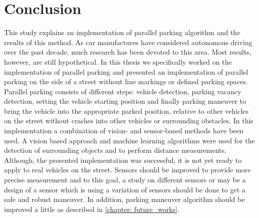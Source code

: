 \chapter{Conclusion}\label{chapter:Conclusion}
This study explains an implementation of parallel parking algorithm and the results of this method. As car manufactures have considered autonomous driving over the past decade, much research has been devoted to this area. Most results, however, are still hypothetical. In this thesis we specifically worked on the implementation of parallel parking and presented an implementation of parallel parking on the side of a street without line markings or defined parking spaces. Parallel parking consists of different steps: vehicle detection, parking vacancy detection, setting the vehicle starting position and finally parking maneuver to bring the vehicle into the appropriate parked position, relative to other vehicles on the street without crashes into other vehicles or surrounding obstacles. In this implementation a combination of vision- and sensor-based methods have been used. A vision based approach and machine learning algorithms were used for the detection of surrounding objects and to perform distance measurements. Although, the presented implementation was successful, it is not yet ready to apply to real vehicles on the street. Sensors should be improved to provide more precise measurement and to this goal, a study on different sensors or may be a design of a sensor which is using a variation of sensors\cite{otherThesis} should be done to get a safe and robust maneuver. In addition, parking maneuver algorithm should be improved a little as described in \ref{chapter: future_works}. 